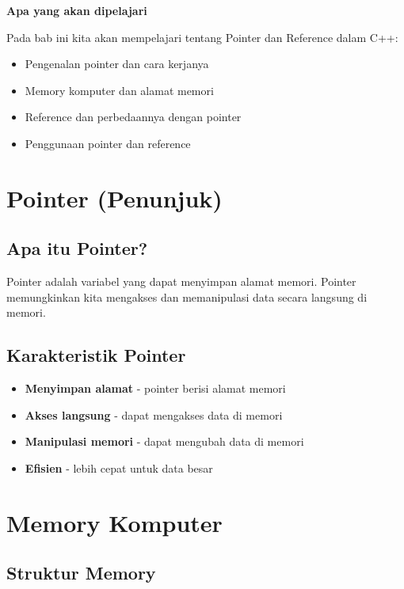 \textbf{Apa yang akan dipelajari}

Pada bab ini kita akan mempelajari tentang Pointer dan Reference dalam C++:

\begin{itemize}
\item Pengenalan pointer dan cara kerjanya
\item Memory komputer dan alamat memori
\item Reference dan perbedaannya dengan pointer
\item Penggunaan pointer dan reference
\end{itemize}

\minitoc

\section{Pointer (Penunjuk)}\label{apa-itu-pointer}

\subsection{Apa itu Pointer?}

Pointer adalah variabel yang dapat menyimpan alamat memori. Pointer memungkinkan kita mengakses dan memanipulasi data secara langsung di memori.

\subsection{Karakteristik Pointer}

\begin{itemize}
\item \textbf{Menyimpan alamat} - pointer berisi alamat memori
\item \textbf{Akses langsung} - dapat mengakses data di memori
\item \textbf{Manipulasi memori} - dapat mengubah data di memori
\item \textbf{Efisien} - lebih cepat untuk data besar
\end{itemize}

\section{Memory Komputer}\label{memory-komputer}

\subsection{Struktur Memory}

